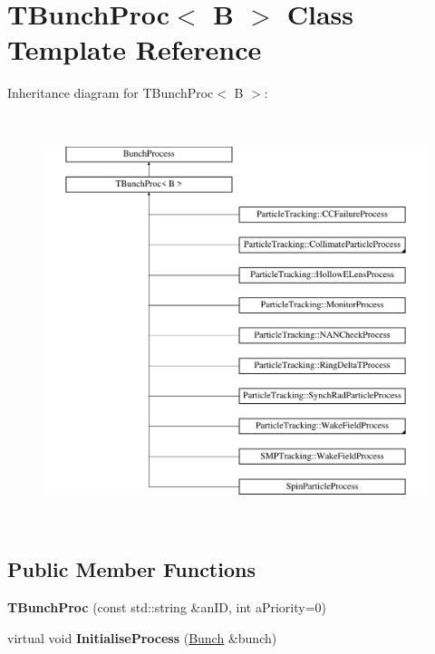 \hypertarget{classTBunchProc}{}\section{T\+Bunch\+Proc$<$ B $>$ Class Template Reference}
\label{classTBunchProc}
Inheritance diagram for T\+Bunch\+Proc$<$ B $>$\+:\begin{figure}[H]
\begin{center}
\leavevmode
\includegraphics[height=12.000000cm]{classTBunchProc}
\end{center}
\end{figure}
\subsection*{Public Member Functions}
\begin{DoxyCompactItemize}
\item 
\mbox{\label{classTBunchProc_a917fc8e23aa5192107594c40b660c7cc}} 
{\bfseries T\+Bunch\+Proc} (const std\+::string \&an\+ID, int a\+Priority=0)
\item 
\mbox{\label{classTBunchProc_af9fd47b6c94c4c6bf9351bad07496e0a}} 
virtual void {\bfseries Initialise\+Process} (\hyperlink{classBunch}{Bunch} \&bunch)
\end{DoxyCompactItemize}
